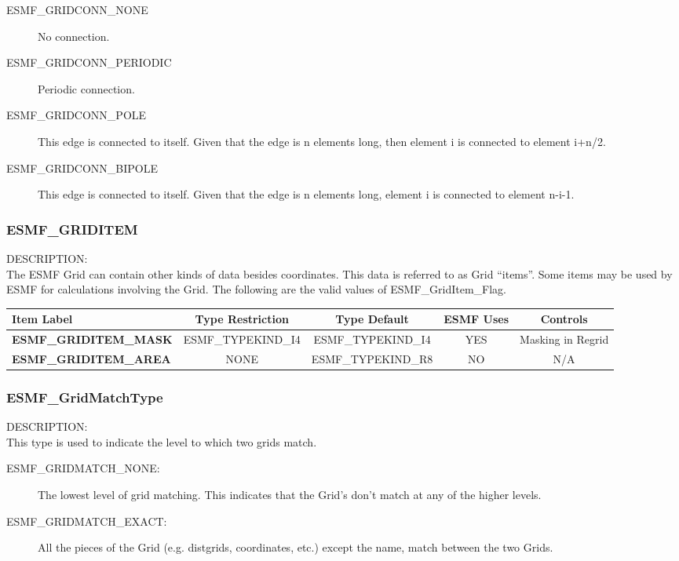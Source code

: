 \medskip
\begin{description}
\item [ESMF\_GRIDCONN\_NONE] No connection.

\item [ESMF\_GRIDCONN\_PERIODIC] Periodic connection.

\item [ESMF\_GRIDCONN\_POLE] This edge is connected to itself. Given
that the edge is n elements long, then element i is connected to
element i+n/2.

\item [ESMF\_GRIDCONN\_BIPOLE] This edge is connected to itself. Given
that the edge is n elements long, element i is connected to element n-i-1.

\end{description}


\subsubsection{ESMF\_GRIDITEM}
\label{sec:opt:griditem}

{\sf DESCRIPTION:\\}
The ESMF Grid can contain other kinds of data besides coordinates. 
This data is referred to as Grid ``items''. Some items may be used
by ESMF for calculations involving the Grid. The following
are the valid values of ESMF\_GridItem\_Flag.

\medskip
\begin{tabular}{|l|c|c|c|c||}
\hline
\hline
Item Label & {\bf Type Restriction}  & {\bf Type Default} & {\bf ESMF Uses} & {\bf Controls} \\
\hline
{\bf ESMF\_GRIDITEM\_MASK}  & ESMF\_TYPEKIND\_I4 & ESMF\_TYPEKIND\_I4 & YES & Masking in Regrid \\
{\bf ESMF\_GRIDITEM\_AREA} & NONE & ESMF\_TYPEKIND\_R8 & NO & N/A \\
\hline
\hline
\end{tabular}



\subsubsection{ESMF\_GridMatchType}
\label{sec:opt:gridmatchtype}

{\sf DESCRIPTION:\\}
 This type is used to indicate the level to which two grids match.

\medskip
\begin{description}
\item [ESMF\_GRIDMATCH\_NONE:] The lowest level of grid matching. 
      This indicates that the Grid's don't match at any of the higher levels. 
\item [ESMF\_GRIDMATCH\_EXACT:] All the pieces of the Grid (e.g. distgrids, 
      coordinates, etc.) except the name, match between the two Grids. 
\end{description}




